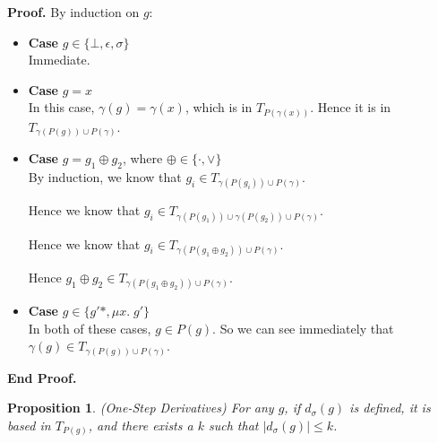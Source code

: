 \documentclass{article}
\newcommand{\fix}[2]{\mu {#1}.\;{#2}}
\newcommand{\setof}[1]{\{{#1}\}}
\newcommand{\deriv}[2]{d_{#1}({#2})}
\newcommand{\pieces}[1]{P({#1})}
\newtheorem{prop}{Proposition}
\newenvironment{proof}{\noindent\textbf{Proof.}}{\noindent\textbf{End Proof.}}
\newenvironment{caseblock}{\begin{itemize}}{\end{itemize}}
\newenvironment{case}[1]{\item \textbf{Case} {#1}\\}{}
\begin{document}
\begin{proof}
  By induction on $g$:
  \begin{caseblock}
    \begin{case}{$g \in \setof{\bot, \epsilon, \sigma}$}
      Immediate. 
    \end{case}

    \begin{case}{$g = x$}
      In this case, $\gamma(g) = \gamma(x)$, which is in $T_{\pieces{\gamma(x)}}$. Hence it is 
      in $T_{\gamma(\pieces{g}) \cup \pieces{\gamma}}$. 
    \end{case}

    \begin{case}{$g = g_1 \oplus g_2$, where $\oplus \in \setof{\cdot, \vee}$}
      By induction, we know that $g_i \in T_{\gamma(\pieces{g_i}) \cup \pieces{\gamma}}$. 

      Hence we know that $g_i \in T_{\gamma(\pieces{g_1}) \cup \gamma(\pieces{g_2}) \cup \pieces{\gamma}}$. 

      Hence we know that $g_i \in T_{\gamma(\pieces{g_1 \oplus g_2}) \cup \pieces{\gamma}}$. 

      Hence $g_1 \oplus g_2 \in T_{\gamma(\pieces{g_1 \oplus g_2}) \cup \pieces{\gamma}}$. 
    \end{case}

    \begin{case}{$g \in \setof{g'*, \fix{x}{g'}}$}
      In both of these cases, $g \in \pieces{g}$. So we can see immediately 
      that $\gamma(g) \in T_{\gamma(\pieces{g}) \cup \pieces{\gamma}}$. 
    \end{case}
  \end{caseblock}
\end{proof}

\begin{prop}{(One-Step Derivatives)}
  For any $g$, if $\deriv{\sigma}{g}$ is defined, it is based in $T_{\pieces{g}}$, and there 
  exists a $k$ such that $|\deriv{\sigma}{g}| \leq k$. 
\end{prop}
\end{document}
